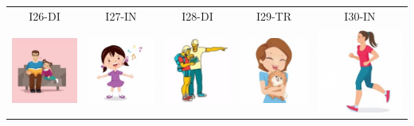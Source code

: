 \documentclass[12pt,notitlepage]{article}
\begin{document}
\begin{center}
\begin{tabular}{|c||c||c||c||c|}
\hline
\hline
I26-DI & I27-IN & I28-DI & I29-TR & I30-IN \\
\includegraphics[width=0.13\columnwidth]{square/I26.jpg} &  \includegraphics[width=0.13\columnwidth]{square/I27.jpg} & \includegraphics[width=0.13\columnwidth]{square/I28.jpg} & \includegraphics[width=0.13\columnwidth]{square/I29.jpg} &  \includegraphics[width=0.13\columnwidth]{square/I30.jpg} \\
\hline
\end{tabular}
\vspace{1em} \\
\end{center}

\newpage
\end{document}
